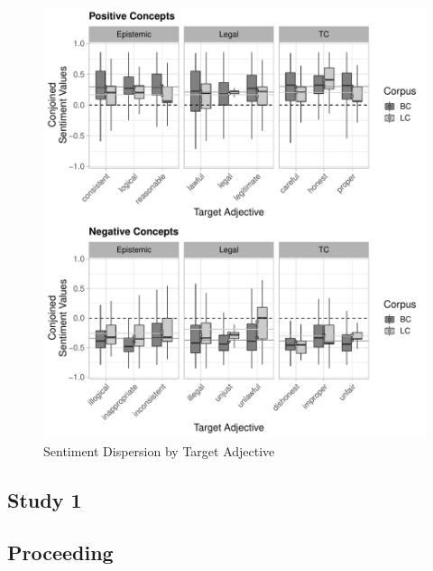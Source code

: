 \documentclass{article}
\begin{document}
\begin{figure}[!ht]
\center
\includegraphics[width=.9\textwidth, keepaspectratio]{bc_lc_summary_stats_adj-distr}
\caption{Sentiment Dispersion by Target Adjective}
\label{fig:SDta}
\end{figure}


\subsection{Study 1}

\subsection{Proceeding}

\end{document}
